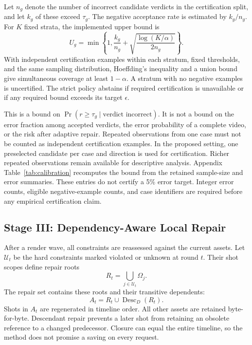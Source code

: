 Let $n_g$ denote the number of incorrect candidate verdicts in the
certification split, and let $k_g$ of these exceed $\tau_g$. The negative
acceptance rate is estimated by $k_g/n_g$. For $K$ fixed strata, the
implemented upper bound is
\begin{equation}
 U_g=\min\left\{1,\frac{k_g}{n_g}
       +\sqrt{\frac{\log(K/\alpha)}{2n_g}}\right\}.
 \label{eq:hoeffding}
\end{equation}
With independent certification examples within each stratum, fixed
thresholds, and the same sampling distribution, Hoeffding's inequality and
a union bound give simultaneous coverage at least $1-\alpha$. A stratum
with no negative examples is uncertified. The strict policy abstains if
required certification is unavailable or if any required bound exceeds its
target $\epsilon$.

This is a bound on $\Pr(r\geq\tau_g\mid\text{verdict incorrect})$.
It is not a bound on the error fraction among accepted verdicts, the error
probability of a complete video, or the risk after adaptive repair.
Repeated observations from one case must not be counted as independent
certification examples. In the proposed setting, one preselected
candidate per case and direction is used for certification. Richer repeated
observations remain available for descriptive analysis. Appendix
Table~\ref{tab:calibration} recomputes the bound from the retained sample-size
and error summaries. These entries do not certify a 5\% error target.
Integer error counts, eligible negative-example counts, and case identifiers
are required before any empirical certification claim.

\subsection{Stage III: Dependency-Aware Local Repair}
\label{sec:repair}

After a render wave, all constraints are reassessed against the current
assets. Let $\mathcal U_t$ be the hard constraints marked violated or unknown
at round $t$. Their shot scopes define repair roots
\begin{equation}
 R_t=\bigcup_{j\in\mathcal U_t}\Omega_j.
\end{equation}
The repair set contains these roots and their transitive dependents:
\begin{equation}
 A_t=R_t\cup\operatorname{Desc}_{D}(R_t).
 \label{eq:repair-closure}
\end{equation}
Shots in $A_t$ are regenerated in timeline order. All other assets are
retained byte-for-byte. Descendant repair prevents a later shot from retaining
an obsolete reference to a changed predecessor. Closure can equal the entire
timeline, so the method does not promise a saving on every request.

